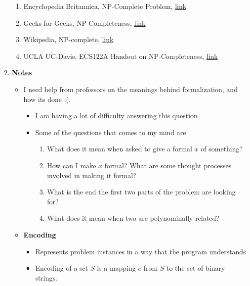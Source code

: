 \documentclass[12pt]{article}
\begin{document}
\begin{enumerate}[1.]
    \begin{enumerate}[1)]
        \item Encyclopedia Britannica, NP-Complete Problem, \href{https://www.britannica.com/science/NP-complete-problem}{link}
        \item Geeks for Geeks, NP-Completeness, \href{https://www.geeksforgeeks.org/np-completeness-set-1/}{link}
        \item Wikipedia, NP-complete, \href{https://simple.wikipedia.org/wiki/NP-complete}{link}
        \item UCLA UC-Davis, ECS122A Handout on NP-Completeness, \href{https://web.cs.ucdavis.edu/~bai/ECS122A/npcnotes.pdf}{link}
    \end{enumerate}

    \item

    \bigskip

    \underline{\textbf{Notes}}

    \bigskip

    \begin{itemize}
        \item I need help from professors on the meanings behind formalization, and how
        its done :(.

        \begin{itemize}
            \item I am having a lot of difficulty answering this question.
            \item Some of the questions that comes to my mind are
            \begin{enumerate}[1.]
                \item What does it mean when asked to give a formal $x$ of something?
                \item How can I make $x$ formal? What are some thought processes involved in making it formal?
                \item What is the end the first two parts of the problem are looking for?
                \item What does it mean when two are polynominally related?
            \end{enumerate}
        \end{itemize}
        \item \textbf{Encoding}

        \begin{itemize}
            \item Represents problem instances in a way that the program understands
            \item Encoding of a set $S$ is a mapping $e$ from $S$ to the set of binary strings.


\end{itemize}
\end{itemize}
\end{enumerate}
\end{document}
